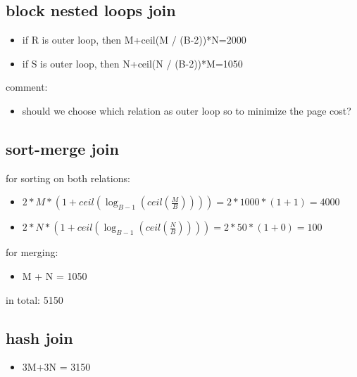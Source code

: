 \documentclass{article}
\providecommand{\tightlist}{%
  \setlength{\itemsep}{0pt}\setlength{\parskip}{0pt}}
\begin{document}
\subsection{block nested loops join}\label{block-nested-loops-join}

\begin{itemize}
\tightlist
\item
  if R is outer loop, then M+ceil(M / (B-2))*N=2000
\item
  if S is outer loop, then N+ceil(N / (B-2))*M=1050
\end{itemize}

comment:

\begin{itemize}
\tightlist
\item
  should we choose which relation as outer loop so to minimize the page
  cost?
\end{itemize}

\subsection{sort-merge join}\label{sort-merge-join}

for sorting on both relations:

\begin{itemize}
\tightlist
\item
  \(2 * M * (1 + ceil(\log_{B-1}(ceil(\frac{M}{B})))) = 2 * 1000 * (1 + 1) = 4000\)
\item
  \(2 * N * (1 + ceil(\log_{B-1}(ceil(\frac{N}{B})))) = 2 * 50 * (1 + 0) = 100\)
\end{itemize}

for merging:

\begin{itemize}
\tightlist
\item
  M + N = 1050
\end{itemize}

in total: 5150

\subsection{hash join}\label{hash-join}

\begin{itemize}
\tightlist
\item
  3M+3N = 3150
\end{itemize}




\end{document}
